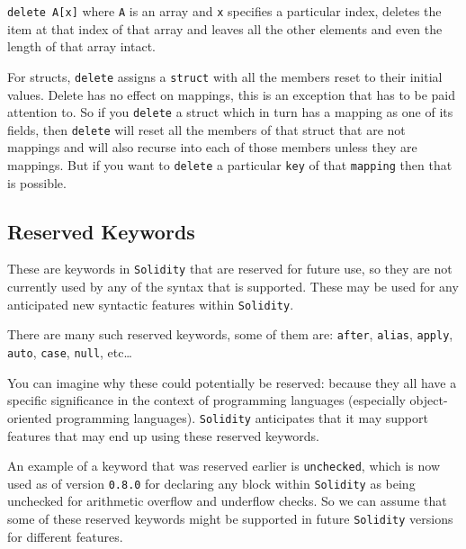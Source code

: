 \texttt{delete\ A{[}x{]}} where \texttt{A} is an array and \texttt{x}
specifies a particular index, deletes the item at that index of that
array and leaves all the other elements and even the length of that
array intact.

For structs, \texttt{delete} assigns a \texttt{struct} with all the
members reset to their initial values. Delete has no effect on mappings,
this is an exception that has to be paid attention to. So if you
\texttt{delete} a struct which in turn has a mapping as one of its
fields, then \texttt{delete} will reset all the members of that struct
that are not mappings and will also recurse into each of those members
unless they are mappings. But if you want to \texttt{delete} a
particular \texttt{key} of that \texttt{mapping} then that is possible.

\subsection{Reserved Keywords}\label{reserved-keywords}

These are keywords in \texttt{Solidity} that are reserved for future
use, so they are not currently used by any of the syntax that is
supported. These may be used for any anticipated new syntactic features
within \texttt{Solidity}.

There are many such reserved keywords, some of them are: \texttt{after},
\texttt{alias}, \texttt{apply}, \texttt{auto}, \texttt{case},
\texttt{null}, etc\ldots{}

You can imagine why these could potentially be reserved: because they
all have a specific significance in the context of programming languages
(especially object-oriented programming languages). \texttt{Solidity}
anticipates that it may support features that may end up using these
reserved keywords.

An example of a keyword that was reserved earlier is \texttt{unchecked},
which is now used as of version \texttt{0.8.0} for declaring any block
within \texttt{Solidity} as being unchecked for arithmetic overflow and
underflow checks. So we can assume that some of these reserved keywords
might be supported in future \texttt{Solidity} versions for different
features.
